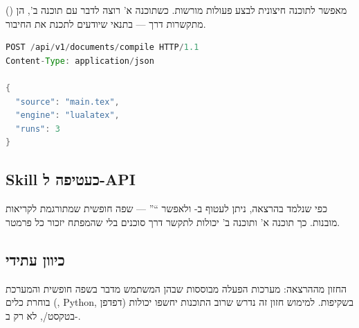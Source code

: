  () מאפשר לתוכנה חיצונית
לבצע פעולות מורשות. כשתוכנה א' רוצה לדבר עם תוכנה ב', הן מתקשרות דרך
 --- בתנאי שיודעים לתכנת את החיבור.

\begin{lstlisting}[language=Java,caption={דוגמת בקשת API (JSON)}]
POST /api/v1/documents/compile HTTP/1.1
Content-Type: application/json

{
  "source": "main.tex",
  "engine": "lualatex",
  "runs": 3
}
\end{lstlisting}


\subsection{Skill כעטיפה ל-API}

כפי שנלמד בהרצאה, ניתן לעטוף  ב- ולאפשר ``''
--- שפה חופשית שמתורגמת לקריאות מובנות. כך תוכנה א' ותוכנה ב' יכולות
לתקשר דרך סוכנים בלי שהמפתח יזכור כל פרמטר.

\subsection{כיוון עתידי}

החזון מההרצאה: מערכות הפעלה מבוססות  שבהן המשתמש מדבר בשפה
חופשית והמערכת בוחרת כלים (, Python, דפדפן) בשקיפות. למימוש
חזון זה נדרש שרוב התוכנות יחשפו יכולות בטקסט/, לא רק ב-.
